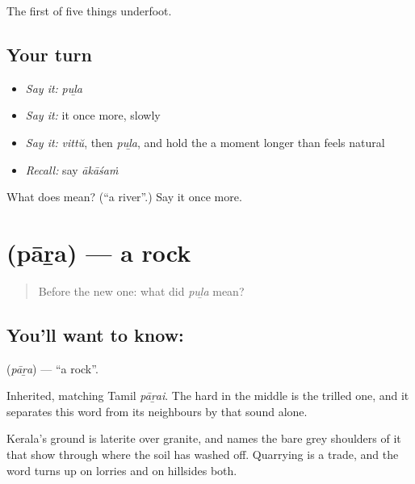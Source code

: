 \begin{grammarlens}[title={What you've built}]
The first of five things underfoot.
\end{grammarlens}

\subsection*{Your turn}
\begin{itemize}
\raggedright
  \item \emph{Say it:} \emph{puḻa}
  \item \emph{Say it:} it once more, slowly
  \item \emph{Say it:} \emph{vittŭ}, then \emph{puḻa}, and hold the  a moment longer than feels natural
  \item \emph{Recall:} say \emph{ākāśaṁ}
\end{itemize}

\begin{tcolorbox}[breakable,colback=teal!4,colframe=teal!35!black,title={Before you move on}]
What does  mean? (\textquotedblleft{}a river\textquotedblright{}.) Say it once more.
\end{tcolorbox}
\section[\texorpdfstring{\ml{പാറ} (pāṟa)}{പാറ (pāṟa)}]{ (pāṟa) — a rock}

\label{lesson:ML-C55-rock}



\begin{quote}
Before the new one: what did \emph{puḻa} mean?
\end{quote}

\subsection*{You'll want to know: }
\textbf{} (\emph{pāṟa}) — \textquotedblleft{}a rock\textquotedblright{}.

Inherited, matching Tamil \emph{pāṟai}. The hard  in the middle is the trilled one, and it separates this word from its neighbours by that sound alone.

Kerala's ground is laterite over granite, and  names the bare grey shoulders of it that show through where the soil has washed off. Quarrying is a  trade, and the word turns up on lorries and on hillsides both.

